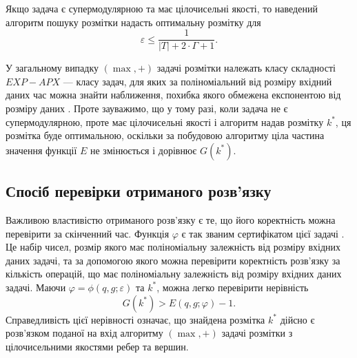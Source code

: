 Якщо задача є супермодулярною та має цілочисельні якості, то наведений алгоритм пошуку розмітки надасть
оптимальну розмітку для 
\begin{equation*}
    \varepsilon \leq \frac{1}{|T|+2\cdot\Gamma+1}.
\end{equation*}

У загальному випадку $(\max,+)$ задачі розмітки належать класу складності 
$EXP-APX$ --- класу задач, для яких за поліноміальний від розміру вхідний даних час 
можна знайти наближення, похибка якого обмежена експонентою від розміру даних \cite{li2016complexity}.
Проте зауважимо, що у тому разі, коли задача не є супермодулярною, проте має цілочисельні якості і алгоритм надав
розмітку $k^*$, ця розмітка буде оптимальною, оскільки за побудовою алгоритму ціла частина
значення функції $E$ не змінюється і дорівнює $G(k^*)$.

\subsection{Спосіб перевірки отриманого розв'язку}

Важливою властивістю отриманого розв’язку є те, що його коректність можна
перевірити за скінченний час. Функція $\varphi$ є так званим сертифікатом цієї задачі \cite{complexity}.
Це набір чисел, розмір якого має поліноміальну залежність від розміру вхідних даних
задачі, та за допомогою якого можна перевірити коректність розв’язку за кількість
операцій, що має поліноміальну залежність від розміру вхідних даних задачі. 
Маючи $\varphi=\phi(q,g;\varepsilon)$ та $k^*$, можна легко перевірити нерівність
\begin{equation*}
    G(k^*)>E(q,g;\varphi)-1.
\end{equation*}
Справедливість цієї нерівності означає, що знайдена розмітка $k^*$ дійсно є розв’язком
поданої на вхід алгоритму $(\max,+)$ задачі розмітки з цілочисельними якостями ребер та
вершин.
